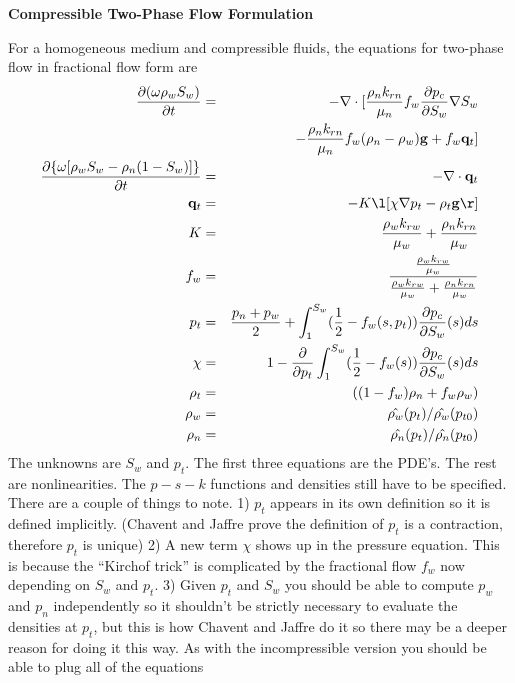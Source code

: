 \documentclass[12pt,dvips]{report}
\begin{document}
\begin{center} \bf Compressible Two-Phase Flow Formulation \end{center}

For a homogeneous medium and compressible fluids, the equations
for two-phase flow in fractional flow form are
\begin{eqnarray}
 \pd{(\omega \rho_w S_w)}{t}  &=& - \deld [ \frac{\rho_n k_{rn}}{\mu_n} f_w \pd{p_c}{S_w} \grad S_w \nonumber \\
&&- \frac{\rho_n  k_{rn}}{\mu_n} f_w (\rho_n - \rho_w) \vec g 
 + f_w \vec q_t ]  \label{mass_balance} \\
\pd{ \{ \omega [ \rho_w S_w - \rho_n (1-S_w)] \} }{t} &=& -\deld  \vec q_t  \label{div_term} \\
\vec q_t &=& - K \l[ \chi \grad p_t  - \rho_t  \vec g \r] \\ 
K &=& \frac{\rho_w k_{rw}}{\mu_w}+ \frac{\rho_n k_{rn}}{\mu_w} \\
f_w &=& \frac{\frac{\rho_w k_{rw}}{\mu_w}}{\frac{\rho_w k_{rw}}{\mu_w}+ \frac{\rho_n k_{rn}}{\mu_w}}\\
p_t &=& \frac{p_n + p_w}{2} + \int_{1}^{S_w}  (\frac{1}{2} - f_w(s,p_t)) \pd{p_c}{S_w}(s) ds \\
\chi & = & 1 - \pd{}{p_t} \int_{1}^{S_w}  (\frac{1}{2} - f_w(s)) \pd{p_c}{S_w}(s) ds \\
\rho_t &=& ((1-f_w)\rho_n + f_w \rho_w) \\
\rho_w &=& \hat{\rho_w}(p_t)/\hat{\rho_w}(p_{t0})\\
\rho_n &=& \hat{\rho_n}(p_t)/\hat{\rho_n}(p_{t0})\\
\end{eqnarray}
The unknowns are $S_w$ and $p_t$. The first three equations are the
PDE's. The rest are nonlinearities. The $p-s-k$ functions and
densities still have to be specified. There are a couple of things to
note. 1) $p_t$ appears in its own definition so it is defined
implicitly. (Chavent and Jaffre prove the definition of $p_t$ is a
contraction, therefore $p_t$ is unique) 2) A new term $\chi$ shows up
in the pressure equation. This is because the ``Kirchof trick'' is
complicated by the fractional flow $f_w$ now depending on $S_w$ and $p_t$.
3) Given $p_t$ and $S_w$ you should be able to compute $p_w$ and $p_n$
independently so it shouldn't be strictly necessary to evaluate the
densities at $p_t$, but this is how Chavent and Jaffre do it so there
may be a deeper reason for doing it this way. As with the
incompressible version you should be able to plug all of the equations
\end{document}
